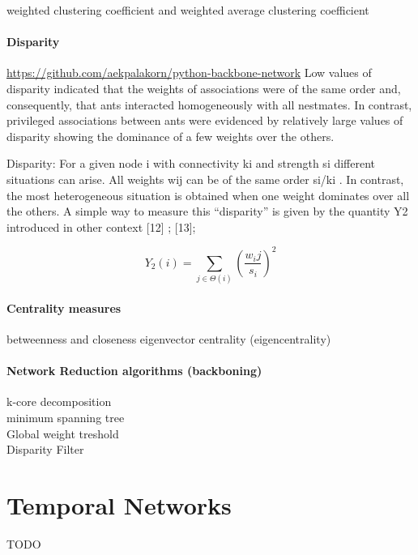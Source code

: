 weighted clustering coefficient and weighted average clustering coefficient~\cite{saramaki2007generalizations}\\

\paragraph*{Disparity}
\url{https://github.com/aekpalakorn/python-backbone-network}
Low values of disparity indicated that the weights of associations were of the same order and, consequently, that ants interacted homogeneously with all nestmates. In contrast, privileged associations between ants were evidenced by relatively large values of disparity showing the dominance of a few weights over the others.~\cite{barthelemy2005characterization}

Disparity: For a given node i   with connectivity  ki  and strength  si  different situations can arise. All weights  wij  can be of the same order  si/ki . In contrast, the most heterogeneous situation is obtained when one weight dominates over all the others. A simple way to measure this “disparity” is given by the quantity  Y2  introduced in other context [12] ;  [13];

$$Y_2(i)=\sum_{j\in \Theta(i)} (\frac{w_ij}{s_i})^2$$

\paragraph*{Centrality measures}
betweenness and closeness
eigenvector centrality (eigencentrality)

\paragraph{Network Reduction algorithms (backboning)}
k-core decomposition\\
minimum spanning tree\\
Global weight treshold\\
Disparity Filter\\

\section{Temporal Networks}
TODO



